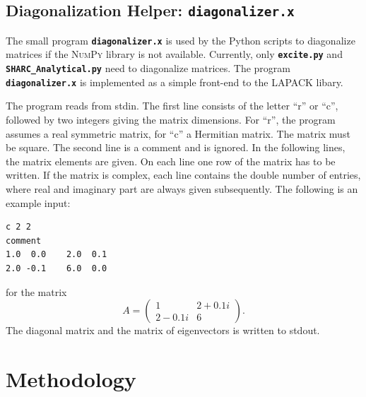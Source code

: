 \documentclass[a4paper,11pt,DIV=15,openany,twoside=false]{scrbook}
\newcommand{\ttt}[1]{\textbf{\texttt{#1}}}
\newenvironment{example}{
  \vspace{0mm}
  \definecolor{shadecolor}{HTML}{E4F4FF}
  \begin{shaded}
}{
  \end{shaded}
}
\begin{document}
\section{Diagonalization Helper: \ttt{diagonalizer.x}}\label{sec:diagonalizer.x}

The small program \ttt{diagonalizer.x} is used by the Python scripts to diagonalize matrices if the \textsc{NumPy} library is not available. Currently, only \ttt{excite.py} and \ttt{SHARC\_Analytical.py} need to diagonalize matrices. The program \ttt{diagonalizer.x} is implemented as a simple front-end to the LAPACK libary.

The program reads from stdin. The first line consists of the letter ``r'' or ``c'', followed by two integers giving the matrix dimensions. For ``r'', the program assumes a real symmetric matrix, for ``c'' a Hermitian matrix. The matrix must be square.
The second line is a comment and is ignored.
In the following lines, the matrix elements are given. On each line one row of the matrix has to be written. If the matrix is complex, each line contains the double number of entries, where real and imaginary part are always given subsequently.
The following is an example input:
\begin{example}
\footnotesize\begin{verbatim}
c 2 2
comment
1.0  0.0    2.0  0.1
2.0 -0.1    6.0  0.0
\end{verbatim}
\end{example}

\normalsize
for the matrix 
\begin{equation}
  A=\begin{pmatrix}
      1 &2+0.1i\\
      2-0.1i&6
    \end{pmatrix}.
\end{equation}
The diagonal matrix and the matrix of eigenvectors is written to stdout.




\chapter{Methodology}
\end{document}
